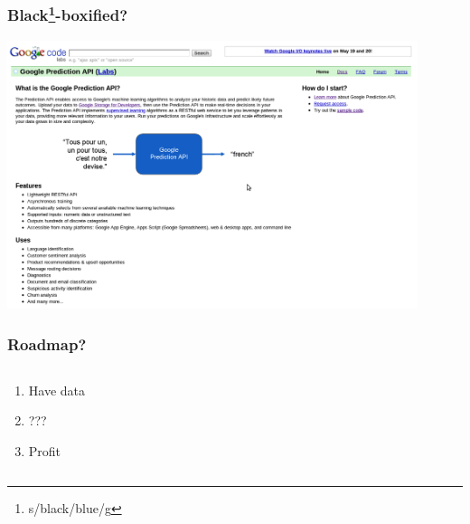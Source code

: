 \documentclass[xcolor=dvipsnames, 9pt]{beamer}
\begin{document}
\begin{frame}[fragile]
    \frametitle{Black\footnote{s/black/blue/g}-boxified?}
    \begin{center}
        \includegraphics[width=0.9\textwidth]{google_pred_api.png}
    \end{center}
\end{frame}


\begin{frame}
  \frametitle{Roadmap?}

  \begin{columns}



    \begin{center}
      \Huge
      \begin{enumerate}
        \item[Step 1:] Have data
        \item[Step 2:] \alert{???}
        \item[Step 3:] Profit
      \end{enumerate}
    \end{center}


  \end{columns}

\end{frame}
\end{document}
